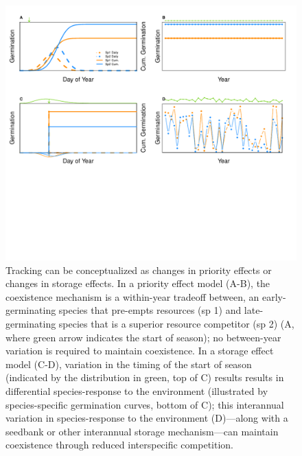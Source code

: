 \documentclass[11pt,letterpaper]{article}
\begin{document}
\begin{figure}[h!]
\centering
\includegraphics[width=1\textwidth]{..//..//..//..//R/graphs/conceptual/PriorityEff_BetHedge.pdf}
\caption{Tracking can be conceptualized as changes in priority effects or changes in storage effects.  In a priority effect model (A-B), the coexistence mechanism is a within-year tradeoff between, an early-germinating species that pre-empts resources (sp 1) and late-germinating species that is a superior resource competitor (sp 2) (A, where green arrow indicates the start of season); no between-year variation is required to maintain coexistence. In a storage effect model (C-D), variation in the timing of the start of season (indicated by the distribution in green, top of C) results results in differential species-response to the environment (illustrated by species-specific germination curves, bottom of C); this interannual variation in species-response to the environment (D)---along with a seedbank or other interannual storage mechanism---can maintain coexistence through reduced interspecific competition.}
\label{fig:conceptmodels} 
\end{figure}


\clearpage
\newpage


\end{document}
